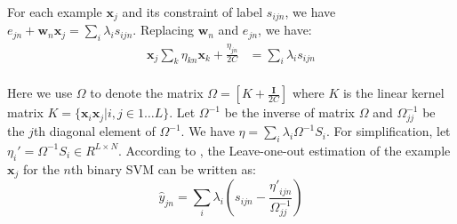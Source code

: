 For each example $\textbf{x}_j$ and its constraint of label $s_{ijn}$, we have $e_{jn}  + \textbf{w}_n\textbf{x}_j= \sum_i\lambda_is_{ijn}$. Replacing $\textbf{w}_n$ and $e_{jn}$,  we have:
\begin{equation}
\begin{aligned}
\textbf{x}_j\sum_k\eta_{kn}\textbf{x}_k+\frac{\eta_{jn}}{2C}&=\sum_i\lambda_is_{ijn}\\
\end{aligned}
\end{equation}

Here we use $\Omega$ to denote the matrix $\Omega=[K+\frac{\mathbf{I}}{2C}]$ where $K$ is the linear kernel matrix $K=\{\textbf{x}_i\textbf{x}_j|i,j\in 1\dots L\}$. Let
 $\Omega^{-1}$ be the inverse of matrix $\Omega$ and $\Omega^{-1}_{jj}$ be the $j$th diagonal element of $\Omega^{-1}$. We have $\eta = \sum_i\lambda_i\Omega^{-1}S_i$. For simplification, let $\eta_i' =\Omega^{-1} S_i\in R^{L\times N}$.
According to  \cite{cawley2006leave}, the Leave-one-out estimation of the example $\textbf{x}_j$ for the $n$th binary SVM can be written as:
\begin{equation}\label{eq:yhat}
\hat{y}_{jn} = \sum_i\lambda_i\left(s_{ijn}-\frac{{\eta'}_{ijn}}{\Omega_{jj}^{-1}}\right)
\end{equation}

